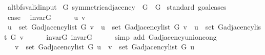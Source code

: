 \begin{isabellebody}
\endisatagproof
{\isafoldproof}%
%
\isadelimproof
\isanewline
%
\endisadelimproof
\isanewline
{}\isamarkupfalse%
\ alt{\isacharunderscore}{\kern0pt}bfs{\isacharunderscore}{\kern0pt}valid{\isacharunderscore}{\kern0pt}input\isanewline
{}\isanewline
{}\isamarkupfalse%
\ G{\isacharcolon}{\kern0pt}\ symmetric{\isacharunderscore}{\kern0pt}adjacency\ \ G\ {\isacharequal}{\kern0pt}\ G\isanewline
%
\isadelimproof
%
\endisadelimproof
%
\isatagproof
{}\isamarkupfalse%
\ {\isacharparenleft}{\kern0pt}standard{\isacharcomma}{\kern0pt}\ goal{\isacharunderscore}{\kern0pt}cases{\isacharparenright}{\kern0pt}\isanewline
\ \ \isamarkupfalse%
\ {}\isanewline
\ \ \isamarkupfalse%
\ {\isacharquery}{\kern0pt}case\ \isamarkupfalse%
\ invar{\isacharunderscore}{\kern0pt}G\ \isacommand{{\isachardot}{\kern0pt}}\isamarkupfalse%
\isanewline
{}\isamarkupfalse%
\isanewline
\ \ \isamarkupfalse%
\ {\isacharparenleft}{\kern0pt}{}\ u\ v{\isacharparenright}{\kern0pt}\isanewline
\ \ \isamarkupfalse%
\ {\isachardoublequoteopen}u\ {\isasymin}\ set\ {\isacharparenleft}{\kern0pt}G{\isachardot}{\kern0pt}adjacency{\isacharunderscore}{\kern0pt}list\ G\ v{\isacharparenright}{\kern0pt}\ {\isasymlongleftrightarrow}\ u\ {\isasymin}\ set\ {\isacharparenleft}{\kern0pt}G{\isachardot}{\kern0pt}adjacency{\isacharunderscore}{\kern0pt}list\ G{}\ v{\isacharparenright}{\kern0pt}\ {\isasymor}\ u\ {\isasymin}\ set\ {\isacharparenleft}{\kern0pt}G{\isachardot}{\kern0pt}adjacency{\isacharunderscore}{\kern0pt}list\ G{}\ v{\isacharparenright}{\kern0pt}{\isachardoublequoteclose}\isanewline
\ \ \ \ \isamarkupfalse%
\ invar{\isacharunderscore}{\kern0pt}G{}\ invar{\isacharunderscore}{\kern0pt}G{}\isanewline
\ \ \ \ \isamarkupfalse%
\ {\isacharparenleft}{\kern0pt}simp\ add{\isacharcolon}{\kern0pt}\ G{\isachardot}{\kern0pt}adjacency{\isacharunderscore}{\kern0pt}union{\isacharunderscore}{\kern0pt}cong{\isacharparenright}{\kern0pt}\isanewline
\ \ \isamarkupfalse%
\ \isamarkupfalse%
\ {\isachardoublequoteopen}{\isachardot}{\kern0pt}{\isachardot}{\kern0pt}{\isachardot}{\kern0pt}\ {\isasymlongleftrightarrow}\ v\ {\isasymin}\ set\ {\isacharparenleft}{\kern0pt}G{\isachardot}{\kern0pt}adjacency{\isacharunderscore}{\kern0pt}list\ G{}\ u{\isacharparenright}{\kern0pt}\ {\isasymor}\ v\ {\isasymin}\ set\ {\isacharparenleft}{\kern0pt}G{\isachardot}{\kern0pt}adjacency{\isacharunderscore}{\kern0pt}list\ G{}\ u{\isacharparenright}{\kern0pt}{\isachardoublequoteclose}\isanewline

\end{isabellebody}
